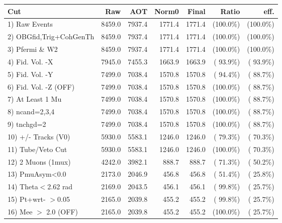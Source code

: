  \begin{table}[h!]\centering
 \begin{tabular}{||l||r|r|r|r|r|r||}
 \hline
 \hline
 Cut & Raw & AOT & Norm0 & Final & Ratio & eff.       \\
 \hline
  1) Raw Events           &       8459.0 &       7937.4 &       1771.4 &       1771.4 & (100.0\%) & (100.0\%) \\
  2) OBGfid,Trig+CohGenTh &       8459.0 &       7937.4 &       1771.4 &       1771.4 & (100.0\%) & (100.0\%) \\
  3) Pfermi \& W2         &       8459.0 &       7937.4 &       1771.4 &       1771.4 & (100.0\%) & (100.0\%) \\
  4) Fid. Vol. -X         &       7945.0 &       7455.3 &       1663.9 &       1663.9 & ( 93.9\%) & ( 93.9\%) \\
  5) Fid. Vol. -Y         &       7499.0 &       7038.4 &       1570.8 &       1570.8 & ( 94.4\%) & ( 88.7\%) \\
  6) Fid. Vol. -Z (OFF)   &       7499.0 &       7038.4 &       1570.8 &       1570.8 & (100.0\%) & ( 88.7\%) \\
  7) At Least 1 Mu        &       7499.0 &       7038.4 &       1570.8 &       1570.8 & (100.0\%) & ( 88.7\%) \\
  8) ncand=2,3,4          &       7499.0 &       7038.4 &       1570.8 &       1570.8 & (100.0\%) & ( 88.7\%) \\
  9) tnchgd=2             &       7499.0 &       7038.4 &       1570.8 &       1570.8 & (100.0\%) & ( 88.7\%) \\
 10) +/- Tracks (V0)      &       5930.0 &       5583.1 &       1246.0 &       1246.0 & ( 79.3\%) & ( 70.3\%) \\
 11) Tube/Veto Cut        &       5930.0 &       5583.1 &       1246.0 &       1246.0 & (100.0\%) & ( 70.3\%) \\
 12) 2 Muons (1mux)       &       4242.0 &       3982.1 &        888.7 &        888.7 & ( 71.3\%) & ( 50.2\%) \\
 13) PmuAsym<0.0          &       2173.0 &       2046.9 &        456.8 &        456.8 & ( 51.4\%) & ( 25.8\%) \\
 14) Theta$<$2.62 rad     &       2169.0 &       2043.5 &        456.1 &        456.1 & ( 99.8\%) & ( 25.7\%) \\
 15) Pt+wrt- $>$0.05      &       2165.0 &       2039.8 &        455.2 &        455.2 & ( 99.8\%) & ( 25.7\%) \\
 16) Mee $>$ 2.0  (OFF)   &       2165.0 &       2039.8 &        455.2 &        455.2 & (100.0\%) & ( 25.7\%) \\

\end{tabular}
\end{table}
